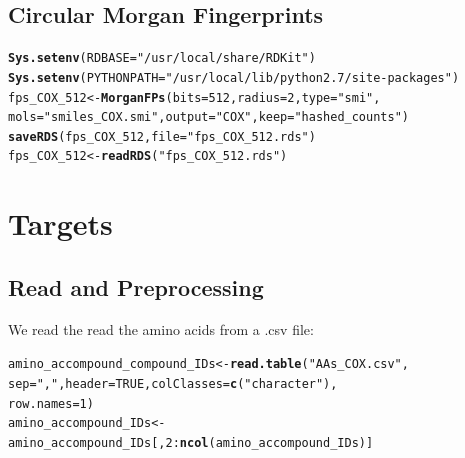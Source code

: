 \documentclass[twoside,a4wide,12pt]{article}\usepackage[]{graphicx}\usepackage[]{color}
\makeatletter
\newcommand{\hlnum}[1]{\textcolor[rgb]{0.686,0.059,0.569}{#1}}%
\newcommand{\hlstr}[1]{\textcolor[rgb]{0.192,0.494,0.8}{#1}}%
\newcommand{\hlopt}[1]{\textcolor[rgb]{0,0,0}{#1}}%
\newcommand{\hlstd}[1]{\textcolor[rgb]{0.345,0.345,0.345}{#1}}%
\newcommand{\hlkwb}[1]{\textcolor[rgb]{0.69,0.353,0.396}{#1}}%
\newcommand{\hlkwc}[1]{\textcolor[rgb]{0.333,0.667,0.333}{#1}}%
\newcommand{\hlkwd}[1]{\textcolor[rgb]{0.737,0.353,0.396}{\textbf{#1}}}%
\newenvironment{kframe}{%
 \def\at@end@of@kframe{}%
 \ifinner\ifhmode%
  \def\at@end@of@kframe{\end{minipage}}%
  \begin{minipage}{\columnwidth}%
 \fi\fi%
 \def\FrameCommand##1{\hskip\@totalleftmargin \hskip-\fboxsep
 \colorbox{shadecolor}{##1}\hskip-\fboxsep
     \hskip-\linewidth \hskip-\@totalleftmargin \hskip\columnwidth}%
 \MakeFramed {\advance\hsize-\width
   \@totalleftmargin\z@ \linewidth\hsize
   \@setminipage}}%
 {\par\unskip\endMakeFramed%
 \at@end@of@kframe}
\newenvironment{knitrout}{}{} %
\makeatother
\begin{document}
\subsection{Circular Morgan Fingerprints}
\begin{knitrout}
\color{fgcolor}\begin{kframe}
\begin{alltt}
\hlkwd{Sys.setenv}\hlstd{(}\hlkwc{RDBASE} \hlstd{=} \hlstr{"/usr/local/share/RDKit"}\hlstd{)}
\hlkwd{Sys.setenv}\hlstd{(}\hlkwc{PYTHONPATH} \hlstd{=} \hlstr{"/usr/local/lib/python2.7/site-packages"}\hlstd{)}
\hlstd{fps_COX_512} \hlkwb{<-} \hlkwd{MorganFPs}\hlstd{(}\hlkwc{bits} \hlstd{=} \hlnum{512}\hlstd{,} \hlkwc{radius} \hlstd{=} \hlnum{2}\hlstd{,} \hlkwc{type} \hlstd{=} \hlstr{"smi"}\hlstd{,}
    \hlkwc{mols} \hlstd{=} \hlstr{"smiles_COX.smi"}\hlstd{,} \hlkwc{output} \hlstd{=} \hlstr{"COX"}\hlstd{,} \hlkwc{keep} \hlstd{=} \hlstr{"hashed_counts"}\hlstd{)}
\hlkwd{saveRDS}\hlstd{(fps_COX_512,} \hlkwc{file} \hlstd{=} \hlstr{"fps_COX_512.rds"}\hlstd{)}
\hlstd{fps_COX_512} \hlkwb{<-} \hlkwd{readRDS}\hlstd{(}\hlstr{"fps_COX_512.rds"}\hlstd{)}
\end{alltt}
\end{kframe}
\end{knitrout}


\section{Targets}

\subsection{Read and Preprocessing}
We read the read the amino acids from a .csv file:
\begin{knitrout}
\color{fgcolor}\begin{kframe}
\begin{alltt}
\hlstd{amino_accompound_compound_IDs} \hlkwb{<-} \hlkwd{read.table}\hlstd{(}\hlstr{"AAs_COX.csv"}\hlstd{,}
    \hlkwc{sep} \hlstd{=} \hlstr{","}\hlstd{,} \hlkwc{header} \hlstd{=} \hlnum{TRUE}\hlstd{,} \hlkwc{colClasses} \hlstd{=} \hlkwd{c}\hlstd{(}\hlstr{"character"}\hlstd{),}
    \hlkwc{row.names} \hlstd{=} \hlnum{1}\hlstd{)}
\hlstd{amino_accompound_IDs} \hlkwb{<-} \hlstd{amino_accompound_IDs[,} \hlnum{2}\hlopt{:}\hlkwd{ncol}\hlstd{(amino_accompound_IDs)]}
\end{alltt}
\end{kframe}
\end{knitrout}
\end{document}
